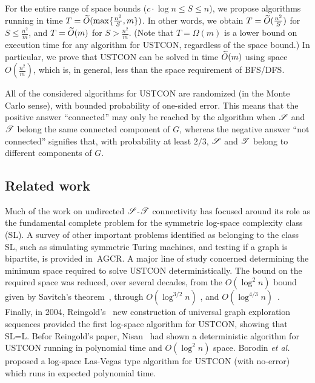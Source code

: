 \documentclass[11pt,a4paper]{article}
\newcommand{\etal}{\textsl{et al.}\xspace}
\renewcommand{\O}{\ensuremath \widetilde O}
\newcommand{\s}{\ensuremath  \mathscr S}
\renewcommand{\t}{\ensuremath \mathscr  T}
\renewcommand{\*}{\hspace*{5mm}}
\begin{document}
For the entire range of space bounds ($c\cdot \log n \leq S \leq n$), we propose algorithms running in time $T = \O (\max\{\frac{n^2}{S}, m\})$. In other words, we obtain $T = \O (\frac{n^2}{S})$ for $S \leq \frac{n^2}{m}$, and $T = \O(m)$ for $S > \frac{n^2}{m}$. (Note that $T = \Omega(m)$ is a lower bound on execution time for any algorithm for USTCON, regardless of the space bound.) In particular, we prove that USTCON can be solved in time $\O(m)$ using space $O(\frac{n^2}{m})$, which is, in general, less than the space requirement of BFS/DFS. 

All of the considered algorithms for USTCON are randomized (in the Monte Carlo sense), with bounded probability of one-sided error. This means that the positive answer ``connected'' may only be reached by the algorithm when $\s$ and $\t$ belong the same connected component of $G$, whereas the negative answer ``not connected'' signifies that,  with probability at least $2/3$, $\s$ and $\t$ belong to different components of $G$.

\subsection{Related work}

Much of the work on undirected $\s$-$\t$ connectivity has focused around its role as the fundamental complete problem for the symmetric log-space complexity class (SL). A survey of other important problems identified as belonging to the class SL, such as simulating symmetric Turing machines, and testing if a graph is bipartite, is provided in~{AGCR}. A major line of study concerned determining the minimum space required to solve USTCON deterministically. The bound on the required space was reduced, over several decades, from the $O(\log^2 n)$ bound given by Savitch's theorem~\cite{Sav}, through $O(\log^{3/2} n)$ \cite{SZ}, and $O(\log^{4/3} n)$~\cite{ATWZ}. Finally, in 2004, Reingold's~\cite{Rei} new construction of universal graph exploration sequences provided the first log-space algorithm for USTCON, showing that SL=L. Befor Reingold's paper, Nisan~\cite{Nis} had shown a deterministic algorithm for USTCON running in polynomial time and $O(\log^2 n)$ space. Borodin \etal~\cite{BCDRT} proposed a log-space Las-Vegas type algorithm for USTCON (with no-error) which runs in expected polynomial time.
\end{document}
